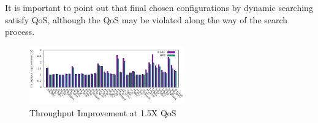 It is important to point out that final chosen configurations by dynamic searching satisfy
QoS, although
the QoS may be violated along the way of the search process.
    \begin{figure}
    \vspace{-0.5cm}
        \centering
        \includegraphics[width=\textwidth, height=2.5cm]{figures/thrpt_res_15.png}
        \caption{Throughput Improvement at 1.5X QoS}
        \label{fig:throughput-results}
        \vspace{-0.5cm}
    \end{figure}\\

